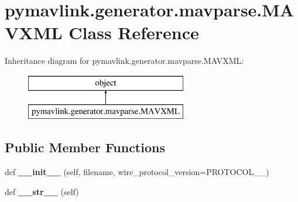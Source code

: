 \hypertarget{classpymavlink_1_1generator_1_1mavparse_1_1MAVXML}{}\section{pymavlink.\+generator.\+mavparse.\+M\+A\+V\+X\+ML Class Reference}
\label{classpymavlink_1_1generator_1_1mavparse_1_1MAVXML}
Inheritance diagram for pymavlink.\+generator.\+mavparse.\+M\+A\+V\+X\+ML\+:\begin{figure}[H]
\begin{center}
\leavevmode
\includegraphics[height=2.000000cm]{classpymavlink_1_1generator_1_1mavparse_1_1MAVXML}
\end{center}
\end{figure}
\subsection*{Public Member Functions}
\begin{DoxyCompactItemize}
\item 
\mbox{\label{classpymavlink_1_1generator_1_1mavparse_1_1MAVXML_aa60a4c95dd95e0b15a24e953e240e5ad}} 
def {\bfseries \+\_\+\+\_\+init\+\_\+\+\_\+} (self, filename, wire\+\_\+protocol\+\_\+version=P\+R\+O\+T\+O\+C\+O\+L\+\_\+\_)
\item 
\mbox{\label{classpymavlink_1_1generator_1_1mavparse_1_1MAVXML_a598e17d0cf02fc8a0d557e66b31549a1}} 
def {\bfseries \+\_\+\+\_\+str\+\_\+\+\_\+} (self)
\end{DoxyCompactItemize}
